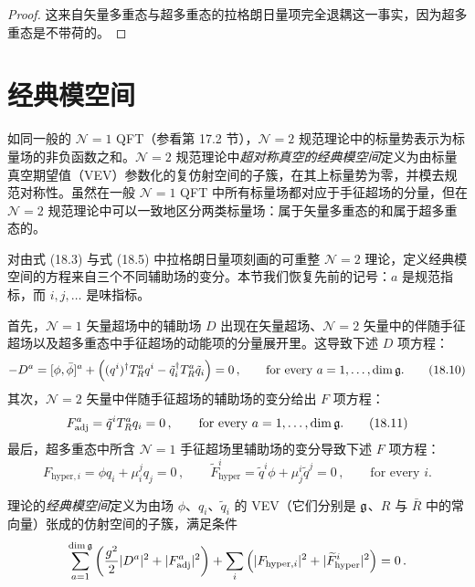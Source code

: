 \begin{proof}
这来自矢量多重态与超多重态的拉格朗日量项完全退耦这一事实，因为超多重态是不带荷的。
\end{proof}

\section{经典模空间}

如同一般的 $\mathcal N=1$ QFT（参看第 17.2 节），$\mathcal N=2$ 规范理论中的标量势表示为标量场的非负函数之和。$\mathcal N=2$ 规范理论中\emph{超对称真空的经典模空间}定义为由标量真空期望值（VEV）参数化的复仿射空间的子簇，在其上标量势为零，并模去规范对称性。虽然在一般 $\mathcal N=1$ QFT 中所有标量场都对应于手征超场的分量，但在 $\mathcal N=2$ 规范理论中可以一致地区分两类标量场：属于矢量多重态的和属于超多重态的。

对由式 (18.3) 与式 (18.5) 中拉格朗日量项刻画的可重整 $\mathcal N=2$ 理论，定义经典模空间的方程来自三个不同辅助场的变分。本节我们恢复先前的记号：$a$ 是规范指标，而 $i,j,\dots$ 是味指标。

首先，$\mathcal N=1$ 矢量超场中的辅助场 $D$ 出现在矢量超场、$\mathcal N=2$ 矢量中的伴随手征超场以及超多重态中手征超场的动能项的分量展开里。这导致下述 $D$ 项方程：
\begin{equation}
-D^a=[\phi,\bar\phi]^a+\left((q^i)^\dagger T_R^a q^i-\tilde q_i^\dagger T_R^a\tilde q_i\right)=0\,,
\qquad\text{for every }a=1,\dots,\dim\mathfrak{g} . \tag{18.10}
\end{equation}
其次，$\mathcal N=2$ 矢量中伴随手征超场的辅助场的变分给出 $F$ 项方程：
\begin{equation}
F^a_{\mathrm{adj}}=\tilde q^iT_R^a q_i=0\,,\qquad\text{for every }a=1,\dots,\dim\mathfrak{g} . \tag{18.11}
\end{equation}
最后，超多重态中所含 $\mathcal N=1$ 手征超场里辅助场的变分导致下述 $F$ 项方程：
\begin{equation}
F_{\mathrm{hyper},i}=\phi q_i+\mu_i^j q_j=0\,,\qquad
\widetilde F^i_{\mathrm{hyper}}=\tilde q^i\phi+\mu_j^i\tilde q^j=0\,,
\qquad\text{for every }i . \tag{18.12}
\end{equation}

\begin{definition}[18.9]
理论的\emph{经典模空间}定义为由场 $\phi$、$q_i$、$\tilde q_i$ 的 VEV（它们分别是 $\mathfrak{g}$、$R$ 与 $\bar R$ 中的常向量）张成的仿射空间的子簇，满足条件
\[
\sum_{a=1}^{\dim\mathfrak{g}}\left(\frac{g^2}{2}|D^a|^2+|F^a_{\mathrm{adj}}|^2\right)
+\sum_i\left(|F_{\mathrm{hyper},i}|^2+|\widetilde F^i_{\mathrm{hyper}}|^2\right)=0\,.
\]
\end{definition}

